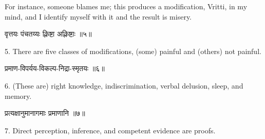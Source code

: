 For instance, someone blames me; this produces a modification,
Vritti, in my mind, and I identify myself with it and the result is
misery. \\

\begin{center}
\begin{sanskrit}
वृत्तयः पंचतय्यः क्लिष्टा अक्लिष्टाः ॥५॥
\end{sanskrit}
\end{center}
5. There are five classes of modifications, (some) painful and
(others) not painful. \\

\begin{center}
\begin{sanskrit}
प्रमाण-विपर्यय-विकल्प-निद्रा-स्मृतयः ॥६॥
\end{sanskrit}
\end{center}
6. (These are) right knowledge, indiscrimination, verbal
delusion, sleep, and memory. \\

\begin{center}
\begin{sanskrit}
प्रत्यक्षानुमानागमाः प्रमाणानि ॥७॥
\end{sanskrit}
\end{center}
7. Direct perception, inference, and
competent evidence are
proofs. \\

